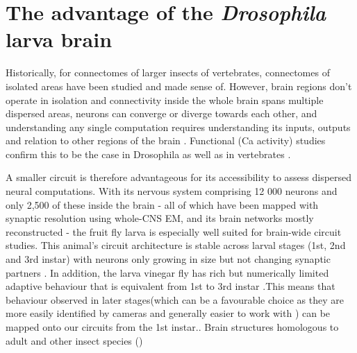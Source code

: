 
\section{The advantage of the \textit{Drosophila} larva brain}
Historically, for connectomes of larger insects of vertebrates, connectomes of isolated areas have been studied and made sense of. However, brain regions don’t operate in isolation and connectivity inside the whole  brain spans multiple dispersed areas, neurons can converge or diverge towards each other, and understanding any single computation requires understanding its inputs, outputs and relation to other regions of the brain  \citep{huang2020bricseq}.  
Functional (Ca activity) studies confirm this to be the case in Drosophila \citep{lemon2015whole}as well as in vertebrates \citep{ahrens2013whole}.

A smaller circuit is therefore advantageous for its accessibility to assess dispersed neural computations. With its nervous system comprising 12 000 neurons and only 2,500  of these inside the brain - all of which have been mapped with synaptic resolution using whole-CNS EM, and its brain networks mostly reconstructed - the fruit fly larva is especially well suited for brain-wide circuit studies. This animal’s circuit architecture is stable across larval stages (1st, 2nd and 3rd instar) with neurons only growing in size but not changing synaptic partners \citep{gerhard2017conserved}. In addition, the larva vinegar fly has rich but numerically limited adaptive behaviour that is equivalent from 1st to 3rd instar \citep{almeida2017ol1mpiad}.This means that behaviour observed in later stages(which can be a favourable choice as they are more easily identified by cameras and generally easier to work with ) can be mapped onto our circuits from the 1st instar.. Brain structures homologous to adult and other insect species (\citep{eichler2017complete, truman2023metamorphosis, carreira2018mdn})

